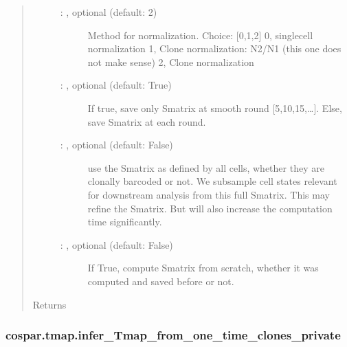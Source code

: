 \documentclass[letterpaper,10pt,english]{sphinxmanual}
\begin{document}
\begin{fulllineitems}
\begin{quote}
\begin{description}
\begin{description}
\item[{ : , optional (default: 2)}] \leavevmode
Method for normalization. Choice: {[}0,1,2{]}
0, single\sphinxhyphen{}cell normalization
1, Clone normalization: N2/N1 (this one does not make sense)
2, Clone normalization

\item[{ : , optional (default: True)}] \leavevmode
If true, save only Smatrix at smooth round {[}5,10,15,…{]}.
Else, save Smatrix at each round.

\item[{ : , optional (default: False)}] \leavevmode
use the Smatrix as defined by all cells, whether they are clonally
barcoded or not. We sub\sphinxhyphen{}sample cell states relevant for downstream
analysis from this full Smatrix. This may refine the Smatrix.
But will also increase the computation time significantly.

\item[{ : , optional (default: False)}] \leavevmode
If True, compute Smatrix from scratch, whether it was
computed and saved before or not.

\end{description}

\item[{Returns}] \leavevmode
{}

\end{description}\end{quote}

\end{fulllineitems}



\subsubsection{cospar.tmap.infer\_Tmap\_from\_one\_time\_clones\_private}
\label{\detokenize{cospar.tmap.infer_Tmap_from_one_time_clones_private:cospar-tmap-infer-tmap-from-one-time-clones-private}}\label{\detokenize{cospar.tmap.infer_Tmap_from_one_time_clones_private::doc}}
\end{document}
